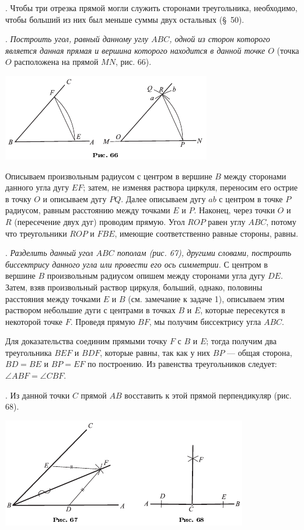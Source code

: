 \documentclass[oneside]{book}
\begin{document}
.
Чтобы три отрезка прямой могли служить сторонами треугольника, необходимо, чтобы больший из них был меньше суммы двух остальных (§~50). %

.
\emph{Построить угол, равный данному углу $ABC$, одной из сторон которого является данная прямая и вершина которого находится в данной точке $O$} (точка $O$ расположена на прямой $MN$, рис. 66).

\includegraphics{pics/ris-66}

Описываем произвольным радиусом с центром в вершине $B$ между сторонами данного угла дугу $EF$;
затем, не изменяя раствора циркуля, переносим его острие в точку $O$ и описываем дугу $PQ$.
Далее описываем дугу $ab$ с центром в точке $P$ радиусом, равным расстоянию между точками $E$ и $P$.
Наконец, через точки $O$ и $R$ (пересечение двух дуг) проводим прямую.
Угол $ROP$ равен углу $ABC$, потому что треугольники $ROP$ и $FBE$, имеющие соответственно равные стороны, равны.

.
\emph{Разделить данный угол $ABC$ пополам (рис. 67), другими словами, построить биссектрису данного угла или провести его ось симметрии.}
С центром в вершине $B$ произвольным радиусом опишем между сторонами угла дугу $DE$.
Затем, взяв произвольный раствор циркуля, больший, однако, половины расстояния между точками $E$ и $B$ (см. замечание к задаче 1), описываем этим раствором небольшие дуги с центрами в точках $B$ и $E$, которые пересекутся в некоторой точке $F$.
Проведя прямую $BF$, мы получим биссектрису угла $ABC$.


Для доказательства соединим прямыми точку $F$ с $B$ и $E$;
тогда получим два треугольника $BEF$ и $BDF$, которые равны, так как у них $BP$ — общая сторона, $BD=BE$ и $BP=EF$ по построению.
Из равенства треугольников следует:
$\angle ABF = \angle CBF$.

.
Из данной точки $C$ прямой $AB$ восставить к этой прямой перпендикуляр (рис. 68).

\includegraphics{pics/ris-67-68}
\end{document}
